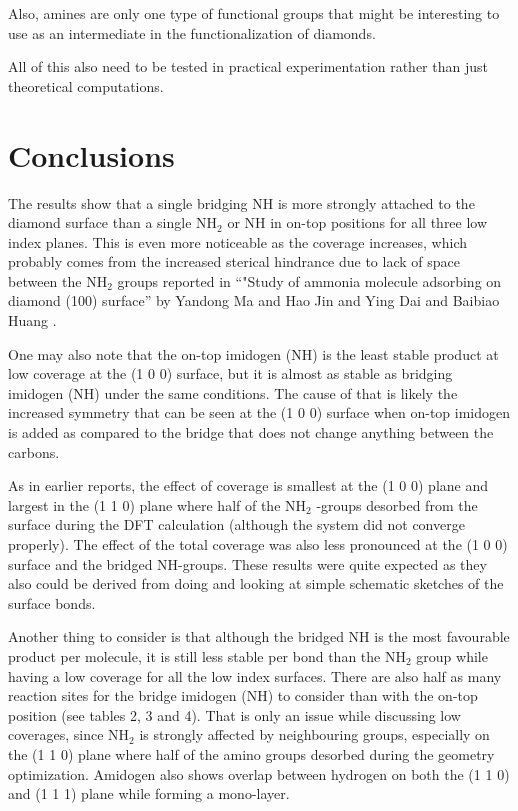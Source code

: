 \documentclass[12pt,a4paper]{article}
\begin{document}
Also, amines are only one type of functional groups that might be interesting to use as an intermediate in the functionalization of diamonds. 


All of this also need to be tested in practical experimentation rather than just theoretical computations.


\section{Conclusions}
The results show that a single bridging NH is more strongly attached to the diamond surface than a single NH$_2$ or NH in on-top positions for all three low index planes. This is even more noticeable as the coverage increases, which probably comes from the increased sterical hindrance due to lack of space between the NH$_2$ groups reported in ``"Study of ammonia molecule adsorbing on diamond (100) surface'' by Yandong Ma and Hao Jin and Ying Dai and Baibiao Huang \cite{yan.dong2010}.

 One may also note that the on-top imidogen (NH) is the least stable product at low coverage at the (1 0 0) surface, but it is almost as stable as bridging imidogen (NH) under the same conditions. The cause of that is likely the increased symmetry that can be seen at the (1 0 0) surface when on-top imidogen is added as compared to the bridge that does not change anything between the carbons. 

 As in earlier reports, the effect of coverage is smallest at the (1 0 0) plane and largest in the (1 1 0) plane where half of the NH$_2$ -groups desorbed from the surface during the DFT calculation (although the system did not converge properly). The effect of the total coverage was also less pronounced at the (1 0 0) surface and the bridged NH-groups. These results were quite expected as they also could be derived from doing and looking at  simple schematic sketches of the surface bonds.
 
 
 Another thing to consider is that although the bridged NH is the most favourable product per molecule, it is still less stable per bond than the NH$_2$ group while having a low coverage for all the low index surfaces. There are also half as many reaction sites for the bridge imidogen (NH) to consider than with the on-top position (see tables 2, 3 and 4). That is only an issue while discussing low coverages, since NH$_2$ is strongly affected by neighbouring groups, especially on the (1 1 0) plane where half of the amino groups desorbed during the geometry optimization. Amidogen also shows overlap between hydrogen on both the (1 1 0) and (1 1 1) plane while forming a mono-layer. 
 
\end{document}
